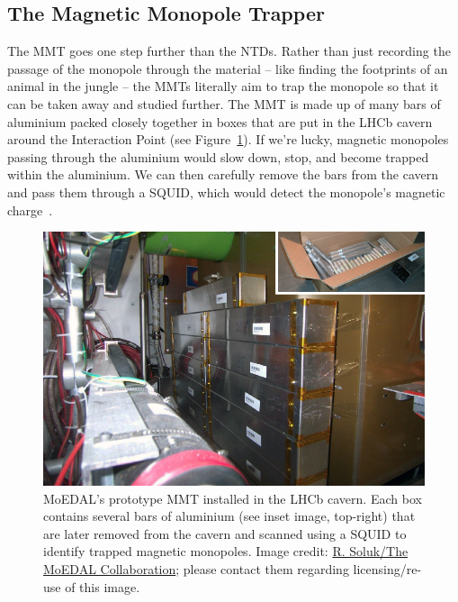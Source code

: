 \subsection{The Magnetic Monopole Trapper}
\label{sec:mmt}
The \acf{MMT} goes one step further than the \acfp{NTD}.
Rather than just recording the passage of the monopole through the material --
like finding the footprints of an animal in the jungle -- the \acp{MMT}
literally aim to trap the monopole so that it can be taken away and
studied further.
The \ac{MMT} is made up of many bars of aluminium packed closely 
together in boxes that are put in the \ac{LHCb} cavern around the
Interaction Point (see Figure~\ref{fig:mmt}).
If we're lucky, magnetic monopoles passing through the aluminium would
slow down, stop, and become trapped within the aluminium. We can then 
carefully remove the bars from the cavern and pass them through a \acf{SQUID},
which would detect the monopole's magnetic charge~\cite{Mermod2014}.

%
\begin{figure}[htbp]
  \centering
  \includegraphics[width=1.0\textwidth]{assets/images/mmt/mmt.jpg}
  \caption[The MoEDAL Magnetic Monopole Trapper]
  {\label{fig:mmt}MoEDAL's prototype \acf{MMT} installed in the \ac{LHCb} cavern. %
Each box contains several bars of aluminium (see inset image, top-right) %
that are later removed from the cavern and scanned using a \ac{SQUID} %
to identify trapped magnetic monopoles.  %
Image credit: \href{http://moedal.web.cern.ch}{R. Soluk/The MoEDAL Collaboration}; %
please contact them regarding licensing/re-use of this image.}
\end{figure}
%

